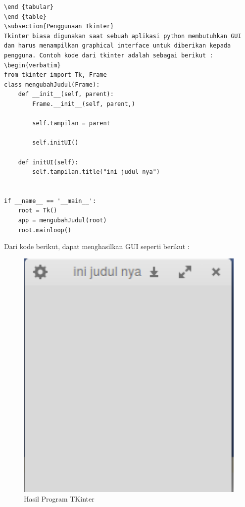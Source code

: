 \begin {verbatim}
\end {tabular}
\end {table}
\subsection{Penggunaan Tkinter}
Tkinter biasa digunakan saat sebuah aplikasi python membutuhkan GUI dan harus menampilkan graphical interface untuk diberikan kepada pengguna. Contoh kode dari tkinter adalah sebagai berikut : 
\begin{verbatim}
from tkinter import Tk, Frame
class mengubahJudul(Frame):
    def __init__(self, parent):
        Frame.__init__(self, parent,)

        self.tampilan = parent

        self.initUI()

    def initUI(self):
        self.tampilan.title("ini judul nya")


if __name__ == '__main__':
    root = Tk()
    app = mengubahJudul(root)
    root.mainloop()
\end{verbatim}
Dari kode berikut, dapat menghasilkan GUI seperti berikut : 
	\begin{figure} [ht]
		\centerline{\includegraphics[width=1\textwidth]{figures/tkinterguiexample.png}}
		\caption{Hasil Program TKinter}
		\label{resultkinter}
	\end{figure}
